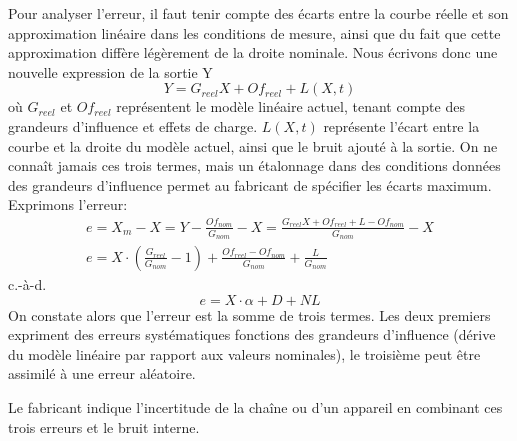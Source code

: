 Pour analyser l'erreur, il faut tenir compte des écarts entre la courbe réelle et son approximation linéaire dans les conditions de mesure, ainsi que du fait que cette approximation diffère légèrement de la droite nominale. Nous écrivons donc une nouvelle expression de la sortie Y
\begin{equation}
    Y = G_{reel}X + Of_{reel} + L(X,t)
\end{equation}
où $G_{reel}$ et $Of_{reel}$ représentent le modèle linéaire actuel, tenant compte des grandeurs d'influence et effets de charge. $L(X,t)$ représente l'écart entre la courbe et la droite du modèle actuel, ainsi que le bruit ajouté à la sortie. On ne connaît jamais ces trois termes, mais un étalonnage dans des conditions données des grandeurs d'influence permet au fabricant de spécifier les écarts maximum. Exprimons l'erreur:
\begin{gather}
    e = X_m - X =  Y - \frac{Of_{nom}}{G_{nom}} - X = \frac{G_{reel}X + Of_{reel} + L -Of_{nom}}{G_{nom}} - X\\
    e = X \cdot(\frac{G_{reel}}{G_{nom}}   - 1) +  \frac{Of_{reel} - Of_{nom}}{G_{nom}}   +  \frac{L}{G_{nom}}
\end{gather}
c.-à-d.
\begin{equation}
    e = X \cdot \alpha  + D + NL
\end{equation}
On constate alors que l'erreur est la somme de trois termes. Les deux premiers expriment des erreurs systématiques fonctions des grandeurs d'influence (dérive du modèle linéaire par rapport aux valeurs nominales), le troisième peut être assimilé à une erreur aléatoire.
\begin{center}
\end{center}
Le fabricant indique l'incertitude de la chaîne ou d'un appareil en combinant ces trois erreurs et le bruit interne.

